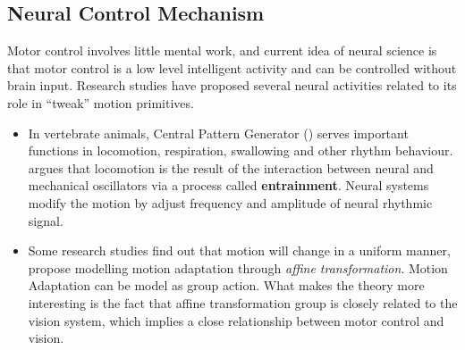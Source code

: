 \subsection{ Neural Control Mechanism}
Motor control involves little mental work,
and current idea of neural science is that motor control is a low level intelligent activity and can be controlled  without brain input. 
Research studies have proposed several neural activities related to its role in ``tweak''  motion primitives.
\begin{itemize}
\item
In vertebrate animals,  Central Pattern Generator (\cpg) serves important functions in locomotion, respiration, swallowing and other rhythm behaviour.
\citet{Cohen1988a} argues that locomotion is the result of the interaction between neural and mechanical oscillators via a process called \textbf{entrainment}.
Neural systems modify the motion by adjust frequency and amplitude of neural rhythmic signal.



\item
Some research studies find out that motion will change in a uniform manner\citep{Viviani1992},\citet{flash2007affine} propose modelling motion adaptation through \emph{affine transformation}.
Motion Adaptation can be model as group action.
What makes the theory more interesting is the fact that affine transformation group is closely related to the vision system, which implies a close relationship between motor control and vision.

\end{itemize}









